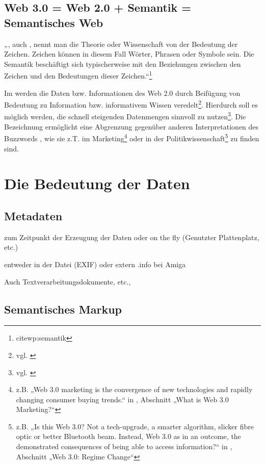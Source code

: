 \subsection{Web 3.0 = Web 2.0 + Semantik = Semantisches Web}

„, auch , nennt man die Theorie oder Wissenschaft von der Bedeutung der Zeichen. Zeichen können in diesem Fall Wörter, Phrasen oder Symbole sein. Die Semantik beschäftigt sich typischerweise mit den Beziehungen zwischen den Zeichen und den Bedeutungen dieser Zeichen.“\footnote{cite{wp:semantik}}

Im  werden die Daten bzw. Informationen des Web 2.0 durch Beifügung von Bedeutung zu Information bzw. informativem Wissen veredelt\footnote{vgl. \cite{nyt:markoff}}. Hierdurch soll es möglich werden, die schnell steigenden Datenmengen sinnvoll zu nutzen\footnote{vgl. \cite{tsp:tolksdorf}}. Die Bezeichnung  ermöglicht eine Abgrenzung gegenüber anderen Interpretationen des Buzzwords , wie sie z.T. im Marketing\footnote{z.B. „Web 3.0 marketing is the convergence of new technologies and rapidly changing consumer buying trends.“ in \cite{web3market}, Abschnitt „What is Web 3.0 Marketing?“} oder in der Politikwissenschaft\footnote{z.B. „Is this Web 3.0? Not a tech-upgrade, a smarter algorithm, slicker fibre optic or better Bluetooth beam. Instead, Web 3.0 as in an outcome, the demonstrated consequences of being able to access information?“ in \cite{web3pol}, Abschnitt „Web 3.0: Regime Change“} zu finden sind.

\section{Die Bedeutung der Daten}

\subsection{Metadaten}

zum Zeitpunkt der Erzeugung der Daten
oder on the fly (Genutzter Plattenplatz, etc.)

entweder in der Datei (EXIF) oder extern .info bei Amiga

Auch Textverarbeitungsdokumente, etc.,

\subsection{Semantisches Markup}

